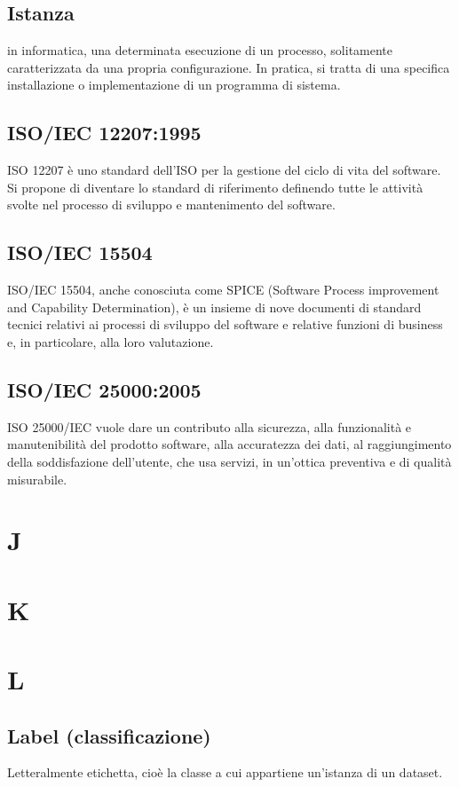 \documentclass{classes/base}
\begin{document}
        \subsection*{Istanza}
        in informatica, una determinata esecuzione di un processo, solitamente caratterizzata da una propria configurazione. In pratica, si tratta di una specifica installazione o implementazione di un programma di sistema.
        
        \subsection*{ISO/IEC 12207:1995}   
        ISO 12207 è uno standard dell'ISO per la gestione del ciclo di vita del software. 
        Si propone di diventare lo standard di riferimento definendo tutte le attività svolte nel processo di sviluppo e mantenimento del software. 

        \subsection*{ISO/IEC 15504}
        ISO/IEC 15504, anche conosciuta come SPICE (Software Process improvement and Capability Determination),
        è un insieme di nove documenti di standard tecnici relativi ai processi di sviluppo del software e relative funzioni di business e, in particolare, alla loro valutazione.
        
        \subsection*{ISO/IEC 25000:2005}
        ISO 25000/IEC vuole dare un contributo alla sicurezza, alla funzionalità e manutenibilità del prodotto software, alla accuratezza dei dati, al raggiungimento della soddisfazione dell'utente, che usa servizi, in un'ottica preventiva e di qualità misurabile.
        
        \newpage  
    \section{J}
    \newpage  
    \section{K}
    \newpage  
    \section{L}
        \subsection*{Label (classificazione)}
        Letteralmente etichetta, cioè la classe a cui appartiene un'istanza di un dataset.
        
\end{document}
